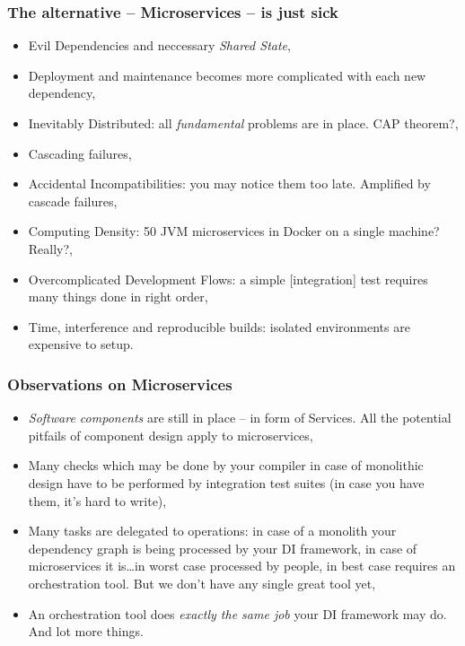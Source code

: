 \documentclass[usenames,dvipsnames]{beamer}
\begin{document}
\begin{frame}
\frametitle{The alternative -- Microservices -- is just sick}

\begin{itemize}
\item Evil Dependencies and neccessary \textit{Shared State},
\item Deployment and maintenance becomes more complicated with each new dependency,
\item Inevitably Distributed: all \textit{fundamental} problems are in place. CAP theorem?,
\item Cascading failures,
\item Accidental Incompatibilities: you may notice them too late. Amplified by cascade failures,
\item Computing Density: 50 JVM microservices in Docker on a single machine? Really?,
\item Overcomplicated Development Flows: a simple [integration\footnotemark[1]] test requires many things done in right order,
\item Time, interference and reproducible builds: isolated environments are expensive to setup.
\end{itemize}
\end{frame}

\begin{frame}
\frametitle{Observations on Microservices}
\begin{itemize}
\item \textit{Software components} are still in place -- in form of Services.
      All the potential pitfails of component design apply to microservices,
\item Many checks which may be done by your compiler in case of monolithic design have  
     to be performed by integration test suites (in case you have them, it's hard to write),   
\item Many tasks are delegated to operations: in case of a monolith your dependency graph is being 
      processed by your DI framework\footnotemark[1], in case of microservices it is\dots in worst case processed by people,
      in best case requires an orchestration tool. But we don't have any single great tool yet,
\item An orchestration tool does \textit{exactly the same job} your DI framework may do. And lot more things.
\end{itemize}
\end{frame}
\end{document}
